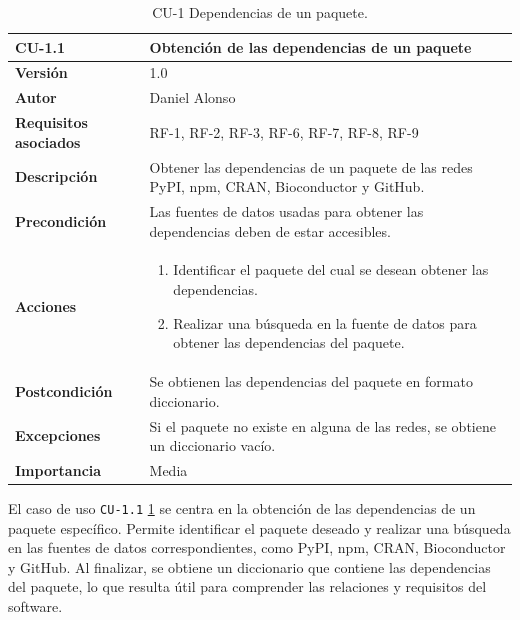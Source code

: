 \begin{table}[p]
	\centering
	\begin{tabularx}{\linewidth}{ p{} p{} }
		\toprule
		\textbf{CU-1.1}               & \textbf{Obtención de las dependencias de un paquete}                              \\
		\toprule
		\textbf{Versión}              & 1.0                                                                              \\
		\textbf{Autor}                & Daniel Alonso                                                                    \\
		\textbf{Requisitos asociados} & RF-1, RF-2, RF-3, RF-6, RF-7, RF-8, RF-9                                         \\
		\textbf{Descripción}          & Obtener las dependencias de un paquete de las redes
		PyPI, npm, CRAN, Bioconductor y GitHub.                                                                          \\
		\textbf{Precondición}         & Las fuentes de datos usadas para obtener las dependencias
		deben de estar accesibles.                                                                                       \\
		\textbf{Acciones}             &
		\begin{enumerate}
			\def\labelenumi{\arabic{enumi}.}
			\tightlist
			\item Identificar el paquete del cual se desean obtener las dependencias.
			\item Realizar una búsqueda en la fuente de datos para obtener las dependencias del paquete.
		\end{enumerate}                      \\
		\textbf{Postcondición}        & Se obtienen las dependencias del paquete en formato diccionario.                 \\
		\textbf{Excepciones}          & Si el paquete no existe en alguna de las redes, se obtiene un diccionario vacío. \\
		\textbf{Importancia}          & Media                                                                            \\
		\bottomrule
	\end{tabularx}
	\caption{CU-1 Dependencias de un paquete.}
	\label{tab:cu1}
\end{table}

El caso de uso \texttt{CU-1.1} \ref{tab:cu1} se centra en la obtención de las dependencias de un paquete específico. Permite
identificar el paquete deseado y realizar una búsqueda en las fuentes de datos correspondientes, como PyPI,
npm, CRAN, Bioconductor y GitHub. Al finalizar, se obtiene un diccionario que contiene las dependencias del
paquete, lo que resulta útil para comprender las relaciones y requisitos del software.




